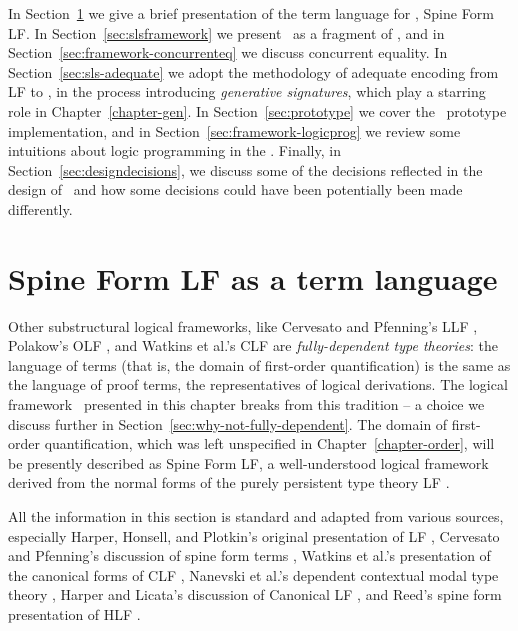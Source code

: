 In Section~\ref{sec:sls-termlanguage} we give a brief presentation of
the term language for \sls, Spine Form LF.
%
In Section~\ref{sec:slsframework} we present \sls~as a fragment of
\ollll, and in Section~\ref{sec:framework-concurrenteq} we discuss
concurrent equality. 
%
In Section~\ref{sec:sls-adequate} we adopt the methodology of adequate
encoding from LF to \sls, in the process introducing {\it generative
  signatures}, which play a starring role in Chapter~\ref{chapter-gen}.
%
In Section~\ref{sec:prototype} we cover the \sls~prototype
implementation, and in Section~\ref{sec:framework-logicprog} we review
some intuitions about logic programming in the \sls. 
%
Finally, in Section~\ref{sec:designdecisions}, we discuss some of the
decisions reflected in the design of \sls~and how some decisions could
have been potentially been made differently.

\section{Spine Form LF as a term language}
\label{sec:sls-termlanguage}

Other substructural logical frameworks, like Cervesato and Pfenning's
LLF \cite{cervesato02linear}, Polakow's OLF \cite{polakow01ordered},
and Watkins et al.'s CLF \cite{watkins02concurrent} are {\it
  fully-dependent type theories}: the language of terms (that is, the
domain of first-order quantification) is the same as the language of
proof terms, the representatives of logical derivations. 
The logical framework \sls~presented in this
chapter breaks from this tradition -- a choice we discuss further in
Section~\ref{sec:why-not-fully-dependent}. The domain of first-order
quantification, which was left unspecified in Chapter~\ref{chapter-order}, 
will be
presently described as Spine Form LF, a well-understood logical
framework derived from the normal forms of the purely persistent type
theory LF \cite{harper93framework}.

All the information in this section is standard and adapted from
various sources, especially Harper, Honsell, and Plotkin's original
presentation of LF \cite{harper93framework}, Cervesato and Pfenning's
discussion of spine form terms \cite{cervesato02linear}, Watkins et
al.'s presentation of the canonical forms of CLF
\cite{watkins02concurrent}, Nanevski et al.'s dependent contextual
modal type theory \cite{nanevski08contextual}, Harper and Licata's
discussion of Canonical LF \cite{harper07mechanizing}, and Reed's
spine form presentation of HLF \cite{reed09hybrid}.


